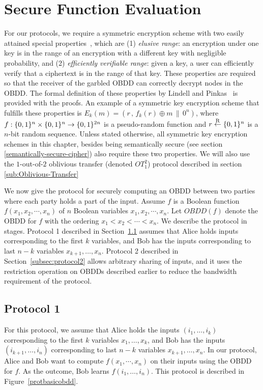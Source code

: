\section{Secure Function Evaluation}
\label{sec:sfe-obdd}


For our protocols, we require a symmetric encryption scheme with two
easily attained special properties~\cite{LP04}, which are {\sf (1)} {\it elusive
range}: an encryption under one key is in the range of an encryption
with a different key with negligible probability, and {\sf (2)} {\it efficiently
verifiable range}: given a key, a user can efficiently verify that a
ciphertext is in the range of that key. These properties are required
so that the receiver of the garbled OBDD can correctly decrypt
nodes in the OBDD. The formal definition of these properties by
Lindell and Pinkas~\cite{LP04} is provided with the proofs. An example
of a symmetric key encryption scheme that fulfills these properties is
$E_k(m)=(r\,,\,f_k(r)\oplus m\,\|\,0^n)$, where
$f:\{0,1\}^n\times\{0,1\}^n\rightarrow\{0,1\}^{2n}$ is a pseudo-random
function and $r\stackrel{\mathrm{R}}{\gets}\{0,1\}^n$ is a $n$-bit random sequence. Unless
stated otherwise, all symmetric key encryption schemes in this chapter,
besides being semantically secure (see section \ref{semantically-secure-cipher})
also require these two properties.  We will also use the $1$-out-of-$2$
oblivious transfer (denoted $OT^2_1$) protocol described in section \ref{sub:Oblivious-Transfer}

We now give the protocol for securely computing an OBDD between two
parties where each party holds a part of the input. Assume $f$ is a
Boolean function $f(x_1,x_2,\cdots,x_n)$ of $n$ Boolean variables
$x_1,x_2,\cdots,x_n$. Let $OBDD(f)$ denote the OBDD for $f$ with the
ordering $x_1 < x_2 < \cdots < x_n$. We describe the protocol in stages.
Protocol 1 described in Section~\ref{sec:obdd-basicprotocol} assumes that
Alice holds inputs corresponding to the first $k$ variables, and 
Bob has the inputs corresponding to last $n-k$ variables
$x_{k+1},\ldots,x_n$. Protocol 2 described in Section~\ref{subsec:protocol2}
allows arbitrary sharing of inputs, and it uses the restriction
operation on OBDDs described earlier to reduce the bandwidth requirement
of the protocol.

\subsection{Protocol 1}
\label{sec:obdd-basicprotocol}


For this protocol, we assume that Alice holds the inputs
$(i_1,\ldots,i_k)$ corresponding to the first $k$ variables
$x_1,\ldots,x_k$, and Bob has the inputs $(i_{k+1},\ldots,i_n)$
corresponding to last $n-k$ variables $x_{k+1},\ldots,x_n$. In our
protocol, Alice and Bob want to compute $f(x_1,\cdots,x_n)$ on
their inputs using the OBDD for $f$. As the outcome, Bob learns
$f(i_1,\ldots,i_n)$.  This protocol is described in
Figure~\ref{protbasicobdd}.


